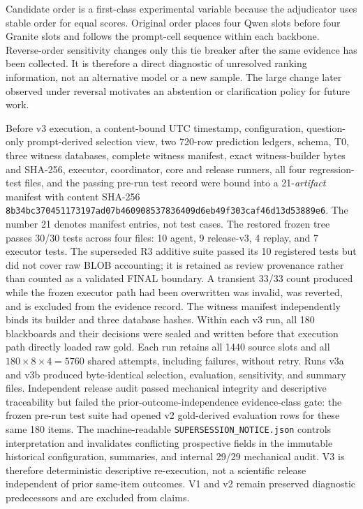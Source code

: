 \documentclass[applsci,article,submit,moreauthors]{Definitions/mdpi}
\begin{document}
Candidate order is a first-class experimental variable because the adjudicator uses stable order for equal scores. Original order places four Qwen slots before four Granite slots and follows the prompt-cell sequence within each backbone. Reverse-order sensitivity changes only this tie breaker after the same evidence has been collected. It is therefore a direct diagnostic of unresolved ranking information, not an alternative model or a new sample. The large change later observed under reversal motivates an abstention or clarification policy for future work.

Before v3 execution, a content-bound UTC timestamp, configuration, question-only prompt-derived selection view, two 720-row prediction ledgers, schema, T0, three witness databases, complete witness manifest, exact witness-builder bytes and SHA-256, executor, coordinator, core and release runners, all four regression-test files, and the passing pre-run test record were bound into a 21-\emph{artifact} manifest with content SHA-256 \texttt{8b34bc370451173197ad07b460908537836409d6eb49f303caf46d13d53889e6}. The number 21 denotes manifest entries, not test cases. The restored frozen tree passes 30/30 tests across four files: 10 agent, 9 release-v3, 4 replay, and 7 executor tests. The superseded R3 additive suite passed its 10 registered tests but did not cover raw BLOB accounting; it is retained as review provenance rather than counted as a validated FINAL boundary. A transient 33/33 count produced while the frozen executor path had been overwritten was invalid, was reverted, and is excluded from the evidence record. The witness manifest independently binds its builder and three database hashes. Within each v3 run, all 180 blackboards and their decisions were sealed and written before that execution path directly loaded raw gold. Each run retains all 1440 source slots and all $180\times8\times4=5760$ shared attempts, including failures, without retry. Runs v3a and v3b produced byte-identical selection, evaluation, sensitivity, and summary files. Independent release audit passed mechanical integrity and descriptive traceability but failed the prior-outcome-independence evidence-class gate: the frozen pre-run test suite had opened v2 gold-derived evaluation rows for these same 180 items. The machine-readable \texttt{SUPERSESSION\_NOTICE.json} controls interpretation and invalidates conflicting prospective fields in the immutable historical configuration, summaries, and internal 29/29 mechanical audit. V3 is therefore deterministic descriptive re-execution, not a scientific release independent of prior same-item outcomes. V1 and v2 remain preserved diagnostic predecessors and are excluded from claims.
\end{document}
